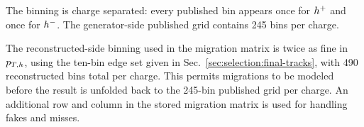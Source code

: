The binning is charge separated: every published bin appears once for $h^{+}$
and once for $h^{-}$.  The generator-side published grid contains 245 bins per
charge.  

The reconstructed-side binning used in the migration matrix is twice as fine in $p_{T,h}$, using the ten-bin edge set given in Sec.~\ref{sec:selection:final-tracks}, with 490 reconstructed bins total per
charge.  This permits migrations to be modeled before the result is unfolded
back to the 245-bin published grid per charge. An additional row and column in
the stored migration matrix is used for handling fakes and misses.

